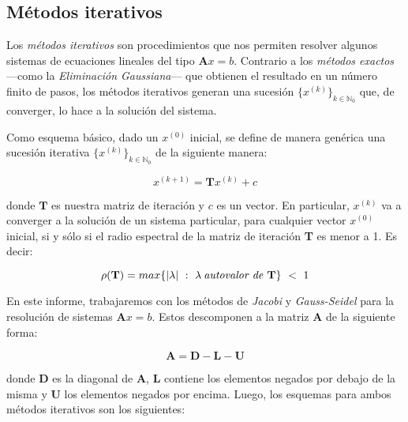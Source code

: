 
\vspace{1em}
\subsection{Métodos iterativos}
Los \textit{métodos iterativos} son procedimientos que nos permiten resolver algunos sistemas de ecuaciones lineales del tipo $\mathbf{A}x = b$. Contrario a los \textit{métodos exactos} ---como la \textit{Eliminación Gaussiana}--- que obtienen el resultado en un número finito de pasos, los métodos iterativos generan una sucesión $\{ x^{(k)} \}_{k \in \mathbb{N}_0}$ que, de converger, lo hace a la solución del sistema.

\vspace{1em}
Como esquema básico, dado un $x^{(0)}$ inicial, se define de manera genérica una sucesión iterativa  $\{ x^{(k)} \}_{k \in \mathbb{N}_0}$ de la siguiente manera:

\begin{equation}\label{sucesion}
    x^{(k+1)} = \mathbf{T}x^{(k)} + c
\end{equation}

\vspace{1em}
\noindent donde $\mathbf{T}$ es nuestra matriz de iteración y $c$ es un vector. En particular, $x^{(k)}$ va a converger a la solución de un sistema particular, para cualquier vector $x^{(0)}$ inicial, si y sólo si el radio espectral de la matriz de iteración \textbf{T} es menor a 1. Es decir:

\begin{equation}\label{espectral}
    \rho(\mathbf{T}) = max\{|\lambda|\ :\ \lambda \: \text{\textit{autovalor de} \textbf{T}}\}\ <\ 1
\end{equation}

\vspace{3em}
En este informe, trabajaremos con los métodos de \textit{Jacobi} y \textit{Gauss-Seidel} para la resolución de sistemas $\mathbf{A}x = b$. Estos descomponen a la matriz \textbf{A} de la siguiente forma: 

\begin{equation}
    \mathbf{A} = \mathbf{D} - \mathbf{L} - \mathbf{U}
\end{equation}

\vspace{1em}
\noindent donde $\mathbf{D}$ es la diagonal de $\mathbf{A}$, $\mathbf{L}$ contiene los elementos negados por debajo de la misma y $\mathbf{U}$ los elementos negados por encima. Luego, los esquemas para ambos métodos iterativos son los siguientes:

